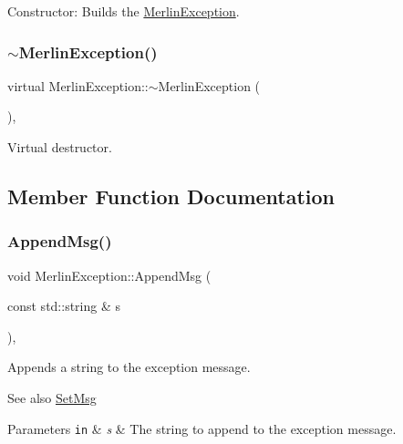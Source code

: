 Constructor\+: Builds the \hyperlink{classMerlinException}{Merlin\+Exception}. \mbox{\label{classMerlinException_a211e13e8cb3d6cbdfcdad4ba9889a3d2}} 
\subsubsection{\texorpdfstring{$\sim$\+Merlin\+Exception()}{~MerlinException()}}
{\footnotesize\ttfamily virtual Merlin\+Exception\+::$\sim$\+Merlin\+Exception (\begin{DoxyParamCaption}{ }\end{DoxyParamCaption})\hspace{0.3cm}{\ttfamily [inline]}, {\ttfamily [virtual]}}

Virtual destructor. 

\subsection{Member Function Documentation}
\mbox{\label{classMerlinException_a056d45fb247c29660580c9c1d350f245}} 
\subsubsection{\texorpdfstring{Append\+Msg()}{AppendMsg()}}
{\footnotesize\ttfamily void Merlin\+Exception\+::\+Append\+Msg (\begin{DoxyParamCaption}\item[{const std\+::string \&}]{s }\end{DoxyParamCaption})\hspace{0.3cm}{\ttfamily [inline]}, {\ttfamily [protected]}}

Appends a string to the exception message. \begin{DoxySeeAlso}{See also}
\hyperlink{classMerlinException_a51f0305351accf8471662e3fa8ba4e7f}{Set\+Msg} 
\end{DoxySeeAlso}

\begin{DoxyParams}[1]{Parameters}
\mbox{\tt in}  & {\em s} & The string to append to the exception message. \\
\hline
\end{DoxyParams}
\mbox{\label{classMerlinException_a8f43d9799e86d593f1e2154a90972638}} 
